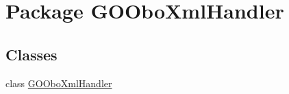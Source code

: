 \hypertarget{namespace_g_o_obo_xml_handler}{
\section{Package GOOboXmlHandler}
\label{namespace_g_o_obo_xml_handler}
}
\subsection*{Classes}
\begin{DoxyCompactItemize}
\item 
class \hyperlink{class_g_o_obo_xml_handler_1_1_g_o_obo_xml_handler}{GOOboXmlHandler}
\end{DoxyCompactItemize}
